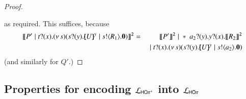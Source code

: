 \begin{proof}
		{}
		{ \Par {} \Par {} }
		{\Re}
		{}
		{}
		{ \Par {} \Par {} }

	\noi as required.
	This suffices, because
	\begin{eqnarray*}
		 \pmap{P' \Par \binp{t}{x} \newsp{s}{ \binp{s}{y} \mapchar{U}{y} \Par \bout{s}{R_1} \inact}}{2} & = &
		\pmap{P'}{2} \Par \repl{\binp{a_2}{y} \binp{y}{x} \pmap{R_2}{2}} \\
		&  & \Par \binp{t}{x} \newsp{s}{ \binp{s}{y} \mapchar{U}{y} \Par \bout{s}{a_2} \inact}
	\end{eqnarray*}
	(and similarly for $Q'$.)
\end{proof}




%



\subsection{Properties for encoding $\mathcal{L}_{\mathsf{HO\pi^{+}}}$ into $\mathcal{L}_{\mathsf{HO}\pi}$}
\label{app:HOpp_to_HOp}

